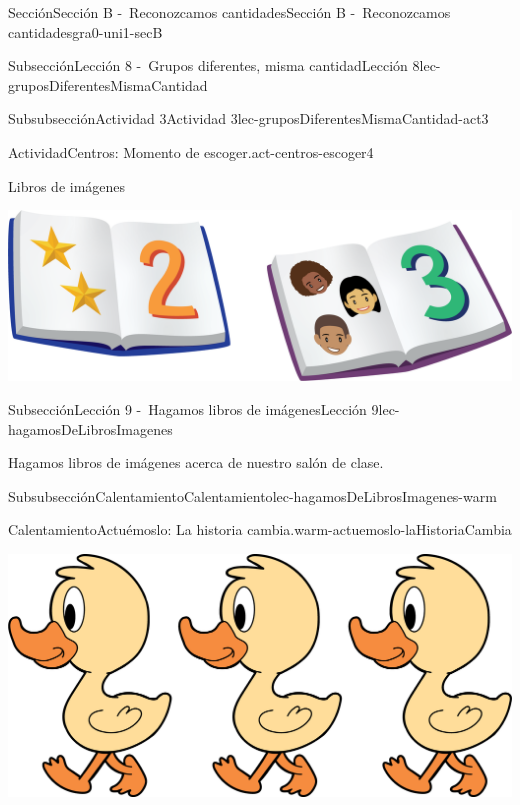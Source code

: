 \documentclass[twoside,10pt,]{article}
\begin{document}
\begin{sectionptx}{Sección}{Sección B -~Reconozcamos cantidades}{}{Sección B -~Reconozcamos cantidades}{}{}{gra0-uni1-secB}
\begin{subsectionptx}{Subsección}{Lección 8 -~Grupos diferentes, misma cantidad}{}{Lección 8}{}{}{lec-gruposDiferentesMismaCantidad}
\begin{subsubsectionptx}{Subsubsección}{Actividad 3}{}{Actividad 3}{}{}{lec-gruposDiferentesMismaCantidad-act3}
\begin{activity}{Actividad}{Centros: Momento de escoger.}{act-centros-escoger4}
\begin{sidebyside}{2}{0.025}{0.025}{0.05}
\begin{sbspanel}{0.45}
\end{sbspanel}%
\begin{sbspanel}{0.45}%
Libros de imágenes%
\par
\includegraphics[width=\linewidth]{external/png-source/K.1.D Beta Student Workbooks.Books.png}
\end{sbspanel}%
\end{sidebyside}%
\end{activity}%
\end{subsubsectionptx}
\end{subsectionptx}
%
%
\typeout{************************************************}
\typeout{************************************************}
%
\begin{subsectionptx}{Subsección}{Lección 9 -~Hagamos libros de imágenes}{}{Lección 9}{}{}{lec-hagamosDeLibrosImagenes}
\begin{introduction}{}%
Hagamos libros de imágenes acerca de nuestro salón de clase.%
\end{introduction}%
%
%
\typeout{************************************************}
\typeout{************************************************}
%
\begin{subsubsectionptx}{Subsubsección}{Calentamiento}{}{Calentamiento}{}{}{lec-hagamosDeLibrosImagenes-warm}
\begin{exploration}{Calentamiento}{Actuémoslo: La historia cambia.}{warm-actuemoslo-laHistoriaCambia}%
\begin{image}{0.2}{0.6}{0.2}{}%
\includegraphics[width=\linewidth]{external/png-source/3 ducks.png}

\end{image}
\end{exploration}
\end{subsubsectionptx}
\end{subsectionptx}
\end{sectionptx}
\end{document}

